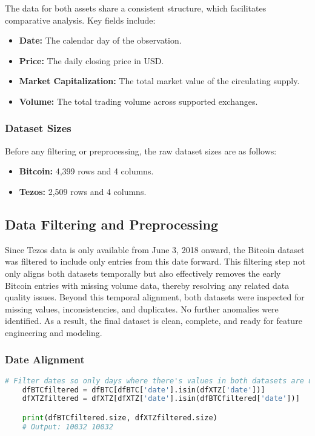 The data for both assets share a consistent structure, which facilitates comparative analysis. Key fields include:
\begin{itemize}
    \item \textbf{Date:} The calendar day of the observation.
    \item \textbf{Price:} The daily closing price in USD.
    \item \textbf{Market Capitalization:} The total market value of the circulating supply.
    \item \textbf{Volume:} The total trading volume across supported exchanges.
\end{itemize}

\subsubsection{Dataset Sizes}
Before any filtering or preprocessing, the raw dataset sizes are as follows:
\begin{itemize}
    \item \textbf{Bitcoin:} 4,399 rows and 4 columns.
    \item \textbf{Tezos:} 2,509 rows and 4 columns.
\end{itemize}

\subsection{Data Filtering and Preprocessing}

Since Tezos data is only available from June 3, 2018 onward, the Bitcoin dataset was filtered to include only entries from this date forward. This filtering step not only aligns both datasets temporally but also effectively removes the early Bitcoin entries with missing volume data, thereby resolving any related data quality issues.
Beyond this temporal alignment, both datasets were inspected for missing values, inconsistencies, and duplicates. No further anomalies were identified. As a result, the final dataset is clean, complete, and ready for feature engineering and modeling.

\subsubsection{Date Alignment}
\begin{lstlisting}[language=Python, caption={Filtering both datasets to common dates}, label={lst:date-alignment}]
    # Filter dates so only days where there's values in both datasets are used
    dfBTCfiltered = dfBTC[dfBTC['date'].isin(dfXTZ['date'])] 
    dfXTZfiltered = dfXTZ[dfXTZ['date'].isin(dfBTCfiltered['date'])]

    print(dfBTCfiltered.size, dfXTZfiltered.size)
    # Output: 10032 10032
\end{lstlisting}

